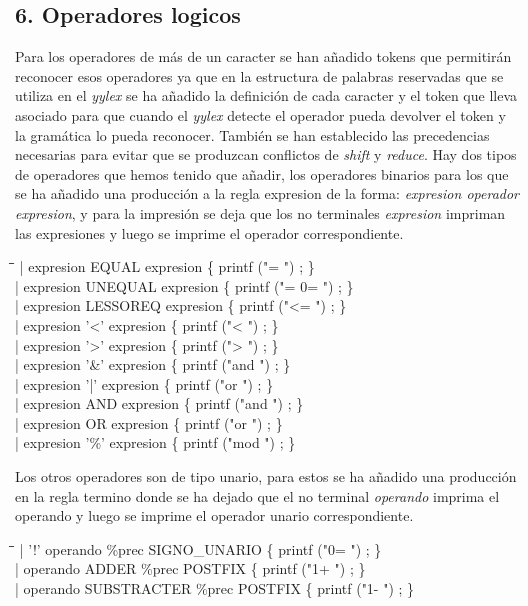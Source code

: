 \documentclass[11pt,spanish]{article}
\begin{document}
		\subsection*{6. Operadores logicos}
		\label{subsec:6}
		Para los operadores de más de un caracter se han añadido tokens que permitirán reconocer esos operadores ya que en la estructura de palabras reservadas que se utiliza en el \textit {yylex} se ha añadido la definición de cada caracter y el token que lleva asociado para que cuando el \textit {yylex} detecte el operador pueda devolver el token y la gramática lo pueda reconocer. También se han establecido las precedencias necesarias para evitar que se produzcan conflictos de \textit {shift} y \textit {reduce}. Hay dos tipos de operadores que hemos tenido que añadir, los operadores binarios para los que se ha añadido una producción a la regla {\ttfamily expresion} de la forma: \textit {expresion operador expresion}, y para la impresión se deja que los no terminales \textit {expresion} impriman las expresiones y luego se imprime el operador correspondiente.
		\begin{tabbing}
			\hspace*{1cm}\=\hspace*{1cm}\= \hspace*{6cm}\=\kill
			\>| expresion  EQUAL expresion\> \>		\{ printf  ("= ") ; \}\\
			\>| expresion  UNEQUAL expresion\> \>		\{ printf  ("= 0= ") ; \}\\
			\>| expresion  LESSOREQ expresion\> \>	\{ printf  ("<= ") ; \}\\
			\>| expresion  '<' expresion\> \>			\{ printf  ("< ") ; \}\\
			\>| expresion  '>' expresion\> \>			\{ printf  ("> ") ; \}\\
			\>| expresion  '\&' expresion\> \>			\{ printf  ("and ") ; \}\\
			\>| expresion  '|' expresion\> \>			\{ printf  ("or ") ; \}\\
			\>| expresion  AND expresion\> \>			\{ printf  ("and ") ; \}\\
			\>| expresion  OR expresion\> \>			\{ printf  ("or ") ; \}\\
			\>| expresion  '\%' expresion\> \>			\{ printf  ("mod ") ; \}
		\end{tabbing}
		Los otros operadores son de tipo unario, para estos se ha añadido una producción en la regla {\ttfamily termino} donde se ha dejado que el no terminal \textit {operando} imprima el operando y luego se imprime el operador unario correspondiente.
		\begin{tabbing}
			\hspace*{1cm}\=\hspace*{1cm}\= \hspace*{8cm}\=\kill
			\>| '!' operando \%prec SIGNO\_UNARIO\> \>  \{ printf ("0= ") ; \}\\
			\>| operando ADDER \%prec POSTFIX\> \>  \{ printf ("1+ ") ; \}\\
			\>| operando SUBSTRACTER \%prec POSTFIX\> \> \{ printf ("1- ") ; \}
		\end{tabbing}
\end{document}
